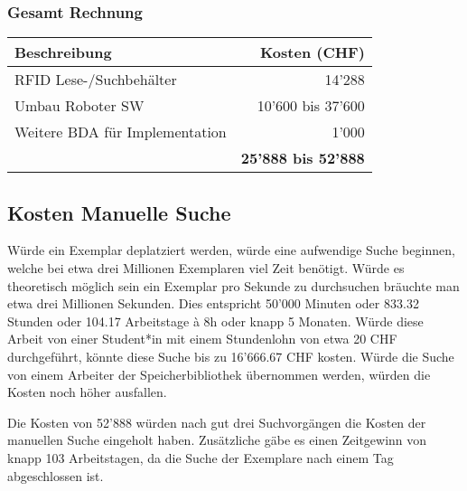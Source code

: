 \subsubsection{Gesamt Rechnung}
\begin{tabularx}{\textwidth}{|X|r|}
	\hline
	\textbf{Beschreibung} & \textbf{Kosten (CHF)} \\
	\hline
	RFID Lese-/Suchbehälter & 14'288 \\
	\hline
	Umbau Roboter SW & 10'600 bis 37'600 \\
	\hline
	Weitere BDA für Implementation & 1'000 \\
	\hline
	& \textbf{25'888 bis 52'888} \\
	\hline
\end{tabularx}

\subsection{Kosten Manuelle Suche}
Würde ein Exemplar deplatziert werden, würde eine aufwendige Suche beginnen, welche bei etwa drei Millionen Exemplaren viel Zeit benötigt. Würde es theoretisch möglich sein ein Exemplar pro Sekunde zu durchsuchen bräuchte man etwa drei Millionen Sekunden. Dies entspricht 50'000 Minuten oder 833.32 Stunden oder 104.17 Arbeitstage à 8h oder knapp 5 Monaten. Würde diese Arbeit von einer Student*in mit einem Stundenlohn von etwa 20 CHF durchgeführt, könnte diese Suche bis zu 16'666.67 CHF kosten. Würde die Suche von einem Arbeiter der Speicherbibliothek übernommen werden, würden die Kosten noch höher ausfallen.

Die Kosten von 52'888 würden nach gut drei Suchvorgängen die Kosten der manuellen Suche eingeholt haben. Zusätzliche gäbe es einen Zeitgewinn von knapp 103 Arbeitstagen, da die Suche der Exemplare nach einem Tag abgeschlossen ist.
